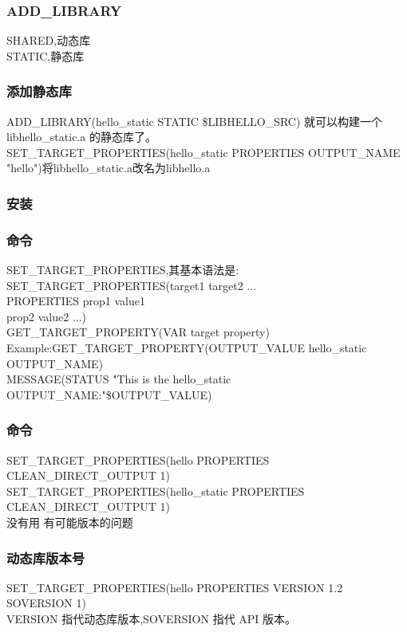 \documentclass{beamer}
\newcommand{\quotes}[1]{"#1"}
\begin{document}
\begin{CJK}{UTF8}{gkai}
   \begin{frame}\frametitle{ADD\_LIBRARY}
     SHARED,动态库\\
     STATIC,静态库\\
   \end{frame}

  \begin{frame}\frametitle{添加静态库}
    ADD\_LIBRARY(hello\_static STATIC \${LIBHELLO\_SRC}) 就可以构建一个
    libhello\_static.a 的静态库了。\\
    SET\_TARGET\_PROPERTIES(hello\_static PROPERTIES OUTPUT\_NAME
    \quotes{hello})将libhello\_static.a改名为libhello.a\\
  \end{frame}

  \begin{frame}\frametitle{安装}

  \end{frame}

  \begin{frame}\frametitle{命令}
    SET\_TARGET\_PROPERTIES,其基本语法是:
    SET\_TARGET\_PROPERTIES(target1 target2 ...\\
    PROPERTIES prop1 value1\\
    prop2 value2 ...)\\
    GET\_TARGET\_PROPERTY(VAR target property)\\
    Example:GET\_TARGET\_PROPERTY(OUTPUT\_VALUE hello\_static
    OUTPUT\_NAME)\\
    MESSAGE(STATUS \quotes{This is the hello\_static OUTPUT\_NAME:}\${OUTPUT\_VALUE})
  \end{frame}

  \begin{frame}\frametitle{命令}
    SET\_TARGET\_PROPERTIES(hello PROPERTIES CLEAN\_DIRECT\_OUTPUT 1)\\
    SET\_TARGET\_PROPERTIES(hello\_static PROPERTIES
    CLEAN\_DIRECT\_OUTPUT 1)\\
    没有用  有可能版本的问题
  \end{frame}

  \begin{frame}\frametitle{动态库版本号}
    SET\_TARGET\_PROPERTIES(hello PROPERTIES VERSION 1.2 SOVERSION
1)\\
    VERSION 指代动态库版本,SOVERSION 指代 API 版本。\\
  \end{frame}


\end{CJK}
\end{document}
